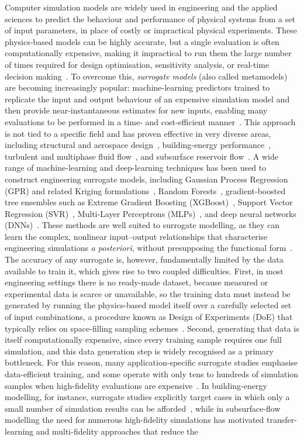 \documentclass[final,5p,times,twocolumn,numbers]{elsarticle}
\begin{document}
Computer simulation models are widely used in engineering and the applied sciences to predict the behaviour and performance of physical systems from a set of input parameters, in place of costly or impractical physical experiments. These physics-based models can be highly accurate, but a single evaluation is often computationally expensive, making it impractical to run them the large number of times required for design optimisation, sensitivity analysis, or real-time decision making~\cite{yuksel2026,ganti2020}. To overcome this, \emph{surrogate models} (also called metamodels) are becoming increasingly popular: machine-learning predictors trained to replicate the input and output behaviour of an expensive simulation model and then provide near-instantaneous estimates for new inputs, enabling many evaluations to be performed in a time- and cost-efficient manner~\cite{koziel2013,yuksel2026}. This approach is not tied to a specific field and has proven effective in very diverse areas, including structural and aerospace design~\cite{yuksel2026}, building-energy performance~\cite{stevanovic2024}, turbulent and multiphase fluid flow~\cite{ganti2020}, and subsurface reservoir flow~\cite{cui2025}. A wide range of machine-learning and deep-learning techniques has been used to construct engineering surrogate models, including Gaussian Process Regression (GPR) and related Kriging formulations~\cite{ablanque2025,baum2025}, Random Forests~\cite{jiao2025rf}, gradient-boosted tree ensembles such as Extreme Gradient Boosting (XGBoost)~\cite{stevanovic2024}, Support Vector Regression (SVR)~\cite{li2024svr}, Multi-Layer Perceptrons (MLPs)~\cite{matai2025}, and deep neural networks (DNNs)~\cite{wei2025mfdnn}. These methods are well suited to surrogate modelling, as they can learn the complex, nonlinear input--output relationships that characterise engineering simulations \emph{a posteriori}, without presupposing the functional form~\cite{stevanovic2024,yuksel2026}. The accuracy of any surrogate is, however, fundamentally limited by the data available to train it, which gives rise to two coupled difficulties. First, in most engineering settings there is no ready-made dataset, because measured or experimental data is scarce or unavailable, so the training data must instead be generated by running the physics-based model itself over a carefully selected set of input combinations, a procedure known as Design of Experiments (DoE) that typically relies on space-filling sampling schemes~\cite{ganti2020,rechevilanova2024}. Second, generating that data is itself computationally expensive, since every training sample requires one full simulation, and this data generation step is widely recognised as a primary bottleneck. For this reason, many application-specific surrogate studies emphasise data-efficient training, and some operate with only tens to hundreds of simulation samples when high-fidelity evaluations are expensive~\cite{stevanovic2024,rechevilanova2024,cui2025}. In building-energy modelling, for instance, surrogate studies explicitly target cases in which only a small number of simulation results can be afforded~\cite{stevanovic2024}, while in subsurface-flow modelling the need for numerous high-fidelity simulations has motivated transfer-learning and multi-fidelity approaches that reduce the 
\end{document}
